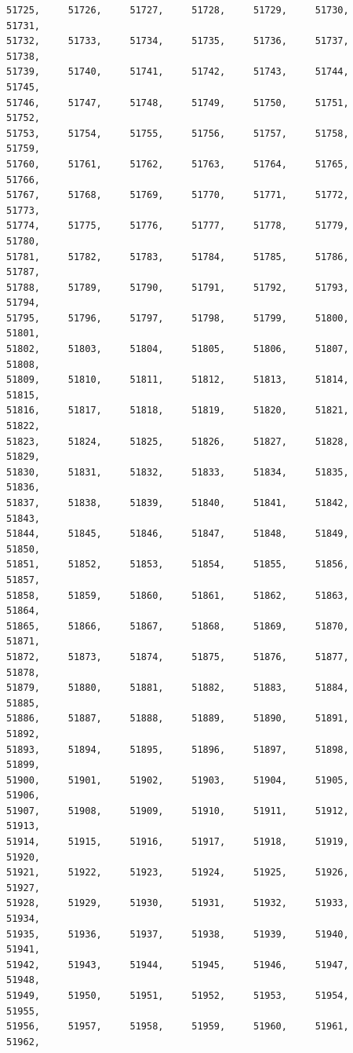 \documentclass[a4paper,11pt]{report}
\begin{document}
\begin{verbatim}
51725,     51726,     51727,     51728,     51729,     51730,     51731,     
51732,     51733,     51734,     51735,     51736,     51737,     51738,     
51739,     51740,     51741,     51742,     51743,     51744,     51745,     
51746,     51747,     51748,     51749,     51750,     51751,     51752,     
51753,     51754,     51755,     51756,     51757,     51758,     51759,     
51760,     51761,     51762,     51763,     51764,     51765,     51766,     
51767,     51768,     51769,     51770,     51771,     51772,     51773,     
51774,     51775,     51776,     51777,     51778,     51779,     51780,     
51781,     51782,     51783,     51784,     51785,     51786,     51787,     
51788,     51789,     51790,     51791,     51792,     51793,     51794,     
51795,     51796,     51797,     51798,     51799,     51800,     51801,     
51802,     51803,     51804,     51805,     51806,     51807,     51808,     
51809,     51810,     51811,     51812,     51813,     51814,     51815,     
51816,     51817,     51818,     51819,     51820,     51821,     51822,     
51823,     51824,     51825,     51826,     51827,     51828,     51829,     
51830,     51831,     51832,     51833,     51834,     51835,     51836,     
51837,     51838,     51839,     51840,     51841,     51842,     51843,     
51844,     51845,     51846,     51847,     51848,     51849,     51850,     
51851,     51852,     51853,     51854,     51855,     51856,     51857,     
51858,     51859,     51860,     51861,     51862,     51863,     51864,     
51865,     51866,     51867,     51868,     51869,     51870,     51871,     
51872,     51873,     51874,     51875,     51876,     51877,     51878,     
51879,     51880,     51881,     51882,     51883,     51884,     51885,     
51886,     51887,     51888,     51889,     51890,     51891,     51892,     
51893,     51894,     51895,     51896,     51897,     51898,     51899,     
51900,     51901,     51902,     51903,     51904,     51905,     51906,     
51907,     51908,     51909,     51910,     51911,     51912,     51913,     
51914,     51915,     51916,     51917,     51918,     51919,     51920,     
51921,     51922,     51923,     51924,     51925,     51926,     51927,     
51928,     51929,     51930,     51931,     51932,     51933,     51934,     
51935,     51936,     51937,     51938,     51939,     51940,     51941,     
51942,     51943,     51944,     51945,     51946,     51947,     51948,     
51949,     51950,     51951,     51952,     51953,     51954,     51955,     
51956,     51957,     51958,     51959,     51960,     51961,     51962,     

\end{verbatim}
\end{document}
